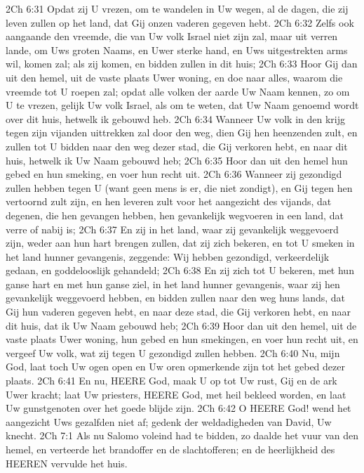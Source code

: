 2Ch 6:31  Opdat zij U vrezen, om te wandelen in Uw wegen, al de dagen, die zij leven zullen op het land, dat Gij onzen vaderen gegeven hebt.
2Ch 6:32  Zelfs ook aangaande den vreemde, die van Uw volk Israel niet zijn zal, maar uit verren lande, om Uws groten Naams, en Uwer sterke hand, en Uws uitgestrekten arms wil, komen zal; als zij komen, en bidden zullen in dit huis;
2Ch 6:33  Hoor Gij dan uit den hemel, uit de vaste plaats Uwer woning, en doe naar alles, waarom die vreemde tot U roepen zal; opdat alle volken der aarde Uw Naam kennen, zo om U te vrezen, gelijk Uw volk Israel, als om te weten, dat Uw Naam genoemd wordt over dit huis, hetwelk ik gebouwd heb.
2Ch 6:34  Wanneer Uw volk in den krijg tegen zijn vijanden uittrekken zal door den weg, dien Gij hen heenzenden zult, en zullen tot U bidden naar den weg dezer stad, die Gij verkoren hebt, en naar dit huis, hetwelk ik Uw Naam gebouwd heb;
2Ch 6:35  Hoor dan uit den hemel hun gebed en hun smeking, en voer hun recht uit.
2Ch 6:36  Wanneer zij gezondigd zullen hebben tegen U (want geen mens is er, die niet zondigt), en Gij tegen hen vertoornd zult zijn, en hen leveren zult voor het aangezicht des vijands, dat degenen, die hen gevangen hebben, hen gevankelijk wegvoeren in een land, dat verre of nabij is;
2Ch 6:37  En zij in het land, waar zij gevankelijk weggevoerd zijn, weder aan hun hart brengen zullen, dat zij zich bekeren, en tot U smeken in het land hunner gevangenis, zeggende: Wij hebben gezondigd, verkeerdelijk gedaan, en goddelooslijk gehandeld;
2Ch 6:38  En zij zich tot U bekeren, met hun ganse hart en met hun ganse ziel, in het land hunner gevangenis, waar zij hen gevankelijk weggevoerd hebben, en bidden zullen naar den weg huns lands, dat Gij hun vaderen gegeven hebt, en naar deze stad, die Gij verkoren hebt, en naar dit huis, dat ik Uw Naam gebouwd heb;
2Ch 6:39  Hoor dan uit den hemel, uit de vaste plaats Uwer woning, hun gebed en hun smekingen, en voer hun recht uit, en vergeef Uw volk, wat zij tegen U gezondigd zullen hebben.
2Ch 6:40  Nu, mijn God, laat toch Uw ogen open en Uw oren opmerkende zijn tot het gebed dezer plaats.
2Ch 6:41  En nu, HEERE God, maak U op tot Uw rust, Gij en de ark Uwer kracht; laat Uw priesters, HEERE God, met heil bekleed worden, en laat Uw gunstgenoten over het goede blijde zijn.
2Ch 6:42  O HEERE God! wend het aangezicht Uws gezalfden niet af; gedenk der weldadigheden van David, Uw knecht.
2Ch 7:1  Als nu Salomo voleind had te bidden, zo daalde het vuur van den hemel, en verteerde het brandoffer en de slachtofferen; en de heerlijkheid des HEEREN vervulde het huis.
